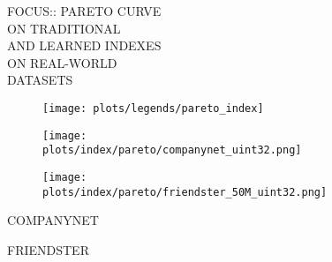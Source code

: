 \documentclass{article}
\begin{document}
\begin{figure}[!htbp]
\fbox
{
\begin{minipage}[t][0.98\textheight][t]{\textwidth}
\vspace*{-5px}
\centering
    \begin{minipage}{0.23\linewidth}
    \footnotesize{FOCUS::  PARETO CURVE\\ ON TRADITIONAL \\ AND LEARNED INDEXES \\ ON REAL-WORLD \\ DATASETS}
    \end{minipage}
   \begin{minipage}{0.75\linewidth}
        \begin{figure}[H]
        \texttt{[image: plots/legends/pareto\_index]}
        \end{figure}
    \end{minipage}
    \vfill

   \begin{minipage}{0.48\linewidth}
        \begin{figure}[H]
        \texttt{[image: plots/index/pareto/companynet\_uint32.png]}
        \end{figure}
    \end{minipage}
    \begin{minipage}{0.48\linewidth}
        \begin{figure}[H]
        \texttt{[image: plots/index/pareto/friendster\_50M\_uint32.png]}
        \end{figure}
    \end{minipage}
    \begin{minipage}{0.48\linewidth}
    \begin{center}
        COMPANYNET
    \end{center}
    \end{minipage}
    \begin{minipage}{0.48\linewidth}
    \begin{center}
        FRIENDSTER
    \end{center}
    \end{minipage}

    \vfill


\end{minipage}}
\end{figure}
\end{document}
